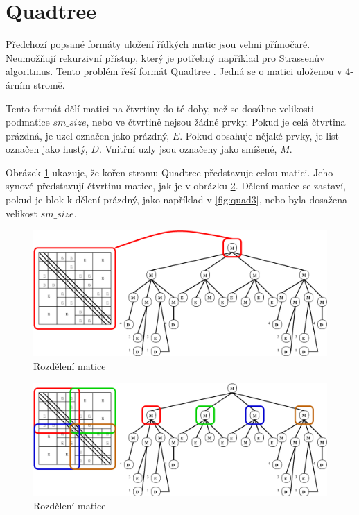 \section{Quadtree}

Předchozí popsané formáty uložení řídkých matic jsou velmi přímočaré. Neumožňují rekurzivní přístup, který je potřebný například pro Strassenův algoritmus. Tento problém řeší formát Quadtree \cite{JA_SNA_08_QUAD}\cite{qdtsf}. Jedná se o matici uloženou v 4-árním stromě.

Tento formát dělí matici na čtvrtiny do té doby, než se dosáhne velikosti podmatice $sm\_size$, nebo ve čtvrtině nejsou žádné prvky. Pokud je celá čtvrtina prázdná, je uzel označen jako prázdný, $E$. Pokud obsahuje nějaké prvky, je list označen jako hustý, $D$. Vnitřní uzly jsou označeny jako smíšené, $M$.

Obrázek \ref{fig:quad1} ukazuje, že kořen stromu Quadtree představuje celou matici. Jeho synové představují čtvrtinu matice, jak je v obrázku \ref{fig:quad2}. Dělení matice se zastaví, pokud je blok k dělení prázdný, jako například v \ref{fig:quad3}, nebo byla dosažena velikost $sm\_size$.

\begin{figure}[htb]\centering
	\includegraphics[width=\textwidth]{./images/quadtree_sourceforge/quad2a.eps}
	\caption{Rozdělení matice}
	\label{fig:quad1}
\end{figure}

\begin{figure}[htb]\centering
	\includegraphics[width=\textwidth]{./images/quadtree_sourceforge/quad2b.eps}
	\caption{Rozdělení matice}
	\label{fig:quad2}
\end{figure}

